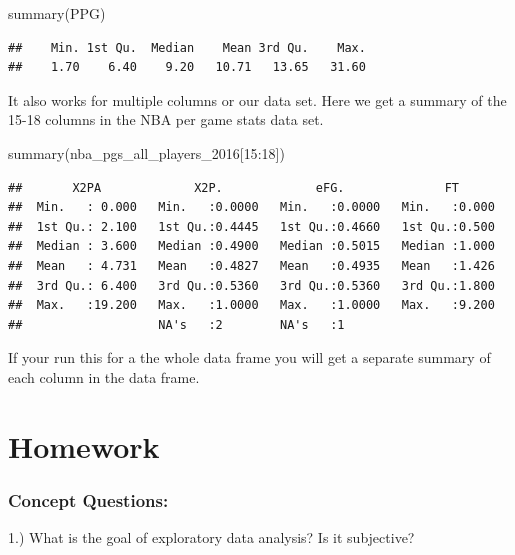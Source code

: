 \documentclass[
]{book}
\newenvironment{Shaded}{\begin{snugshade}}{\end{snugshade}}
\newcommand{\DecValTok}[1]{\textcolor[rgb]{0.00,0.00,0.81}{#1}}
\newcommand{\FunctionTok}[1]{\textcolor[rgb]{0.00,0.00,0.00}{#1}}
\newcommand{\NormalTok}[1]{#1}
\newcommand{\SpecialCharTok}[1]{\textcolor[rgb]{0.00,0.00,0.00}{#1}}
\theoremstyle{definition}
\theoremstyle{definition}
\theoremstyle{definition}
\theoremstyle{definition}
\theoremstyle{remark}
\begin{document}
\begin{Shaded}
\begin{Highlighting}[]
\FunctionTok{summary}\NormalTok{(PPG)}
\end{Highlighting}
\end{Shaded}

\begin{verbatim}
##    Min. 1st Qu.  Median    Mean 3rd Qu.    Max. 
##    1.70    6.40    9.20   10.71   13.65   31.60
\end{verbatim}

It also works for multiple columns or our data set. Here we get a summary of the 15-18 columns in the NBA per game stats data set.

\begin{Shaded}
\begin{Highlighting}[]
\FunctionTok{summary}\NormalTok{(nba\_pgs\_all\_players\_2016[}\DecValTok{15}\SpecialCharTok{:}\DecValTok{18}\NormalTok{])}
\end{Highlighting}
\end{Shaded}

\begin{verbatim}
##       X2PA             X2P.             eFG.              FT       
##  Min.   : 0.000   Min.   :0.0000   Min.   :0.0000   Min.   :0.000  
##  1st Qu.: 2.100   1st Qu.:0.4445   1st Qu.:0.4660   1st Qu.:0.500  
##  Median : 3.600   Median :0.4900   Median :0.5015   Median :1.000  
##  Mean   : 4.731   Mean   :0.4827   Mean   :0.4935   Mean   :1.426  
##  3rd Qu.: 6.400   3rd Qu.:0.5360   3rd Qu.:0.5360   3rd Qu.:1.800  
##  Max.   :19.200   Max.   :1.0000   Max.   :1.0000   Max.   :9.200  
##                   NA's   :2        NA's   :1
\end{verbatim}

If your run this for a the whole data frame you will get a separate summary of each column in the data frame.

\hypertarget{homework-1}{%
\section{Homework}\label{homework-1}}

\hypertarget{concept-questions-1}{%
\subsubsection{Concept Questions:}\label{concept-questions-1}}

1.) What is the goal of exploratory data analysis? Is it subjective?
\end{document}
